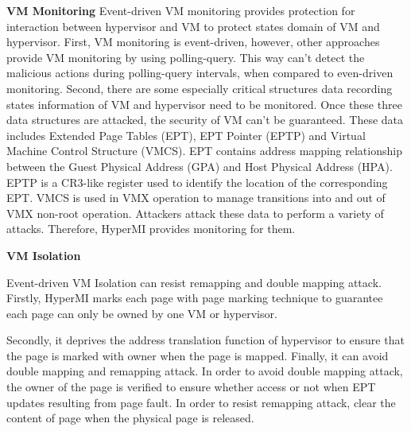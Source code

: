 \documentclass[conference]{IEEEtran}
\begin{document}
\textbf{VM Monitoring}
Event-driven VM monitoring provides protection for interaction between hypervisor and VM to protect states domain of VM and hypervisor.
First, VM monitoring is event-driven, however, other approaches provide VM monitoring by using polling-query. This way can't detect the malicious actions during polling-query intervals,
when compared to even-driven monitoring. 
Second, there are some especially critical structures data recording states information of VM and hypervisor need to be monitored. Once these three data structures are attacked, the security of VM can't be guaranteed. These data includes Extended Page Tables (EPT), EPT Pointer (EPTP) and Virtual Machine Control Structure (VMCS). EPT contains address mapping relationship between the Guest Physical Address (GPA) and Host Physical Address (HPA). EPTP is a CR3-like register used to identify the location of the corresponding EPT. VMCS is used in VMX operation to manage transitions into and out of VMX non-root operation. 
Attackers attack these data to perform a variety of attacks. Therefore, HyperMI provides monitoring for them.


\textbf{VM Isolation}

Event-driven VM Isolation can resist remapping and double mapping attack.
Firstly, HyperMI marks each page with page marking technique to guarantee each page can only be owned by one VM or hypervisor.

Secondly, it deprives the address translation function of hypervisor to ensure that the page is marked with owner when the page is mapped. 
Finally, it can avoid double mapping and remapping attack. In order to avoid double mapping attack, the owner of the page is verified to ensure whether access or not when EPT updates resulting from page fault. In order to resist remapping attack, clear the content of page when the physical page is released.
\end{document}
